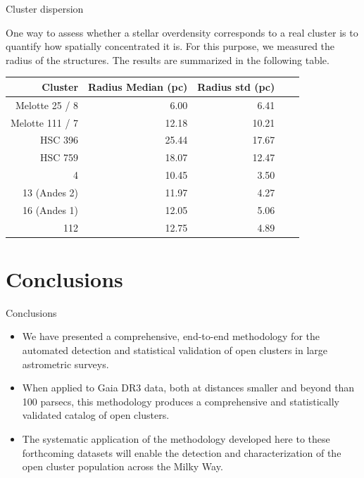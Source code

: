 \documentclass{beamer}
\begin{document}
\begin{frame}{Cluster dispersion}

\begin{minipage}\textwidth
One way to assess whether a stellar overdensity corresponds to a real cluster is to quantify how spatially concentrated it is. For this purpose, we measured the radius of the structures. The results are summarized in the following table.

\begin{table}
\centering
\small
\begin{tabular}{rrrrr}
\hline
Cluster & Radius Median (pc) & Radius std (pc) \\
\hline
Melotte 25 / 8  & 6.00 & 6.41 \\
Melotte 111 / 7 & 12.18 & 10.21 \\
HSC 396 & 25.44 & 17.67  \\
HSC 759 & 18.07 & 12.47  \\
4    & 10.45 & 3.50 \\
13 (Andes 2)  & 11.97 & 4.27 \\
16 (Andes 1)   & 12.05 & 5.06 \\
112  & 12.75 & 4.89 \\
\hline
\end{tabular}
\end{table}

\end{minipage}
\end{frame}

\section{Conclusions}

\begin{frame}{Conclusions}
\begin{minipage}\textwidth
\begin{itemize}
    \item We have presented a comprehensive, end-to-end methodology for the automated detection and statistical validation of open clusters in large astrometric surveys.\\
    \item When applied to Gaia DR3 data, both at distances smaller and beyond than 100 parsecs, this methodology produces a comprehensive and statistically validated catalog of open clusters.
    \item The systematic application of the methodology developed here to these forthcoming datasets will enable the detection and characterization of the open cluster population across the Milky
Way.
\end{itemize}
\end{minipage}
\end{frame}
\end{document}
